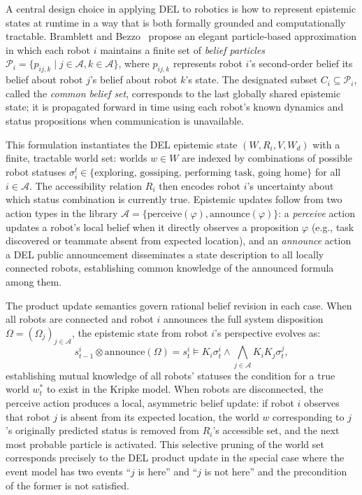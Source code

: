 \documentclass[12pt,a4paper]{article}
\theoremstyle{definition}
\theoremstyle{plain}
\begin{document}
A central design choice in applying DEL to robotics is how to represent epistemic states
at runtime in a way that is both formally grounded and computationally tractable. Bramblett
and Bezzo~\cite{bramblett2023frontiers} propose an elegant particle-based approximation
in which each robot $i$ maintains a finite set of \textit{belief particles}
$\mathcal{P}_i = \{p_{ij,k} \mid j \in \mathcal{A}, k \in \mathcal{A}\}$, where $p_{ij,k}$
represents robot $i$'s second-order belief its belief about robot $j$'s belief about
robot $k$'s state. The designated subset $C_i \subseteq \mathcal{P}_i$, called the
\textit{common belief set}, corresponds to the last globally shared epistemic state; it
is propagated forward in time using each robot's known dynamics and status propositions
when communication is unavailable.

This formulation instantiates the DEL epistemic state $(W, R_i, V, W_d)$ with a finite,
tractable world set: worlds $w \in W$ are indexed by combinations of possible robot
statuses $\sigma_i^t \in \{\text{exploring, gossiping, performing task, going home}\}$
for all $i \in \mathcal{A}$. The accessibility relation $R_i$ then encodes robot $i$'s
uncertainty about which status combination is currently true. Epistemic updates follow
from two action types in the library $\mathcal{A} = \{\mathrm{perceive}(\varphi),
\mathrm{announce}(\varphi)\}$: a \textit{perceive} action updates a robot's local belief
when it directly observes a proposition $\varphi$ (e.g., task discovered or teammate
absent from expected location), and an \textit{announce} action a DEL public
announcement disseminates a state description to all locally connected robots,
establishing common knowledge of the announced formula among them.

The product update semantics govern rational belief revision in each case. When all
robots are connected and robot $i$ announces the full system disposition
$\Omega = (\Omega_j)_{j \in \mathcal{A}}$, the epistemic state from robot $i$'s
perspective evolves as:
\[
s^i_{t-1} \otimes \mathrm{announce}(\Omega) = s^i_t \models
K_i \sigma^i_t \wedge \bigwedge_{j \in \mathcal{A}} K_i K_j \sigma^j_t,
\]
establishing mutual knowledge of all robots' statuses the condition for a true world
$w^*_t$ to exist in the Kripke model. When robots are disconnected, the perceive action
produces a local, asymmetric belief update: if robot $i$ observes that robot $j$ is absent
from its expected location, the world $w$ corresponding to $j$'s originally predicted status
is removed from $R_i$'s accessible set, and the next most probable particle is activated.
This selective pruning of the world set corresponds precisely to the DEL product update in
the special case where the event model has two events ``$j$ is here'' and ``$j$ is not
here'' and the precondition of the former is not satisfied.
\end{document}
